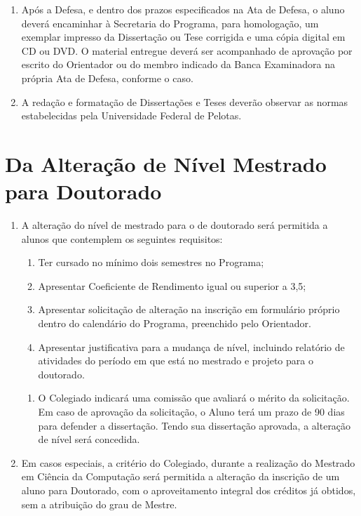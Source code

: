 \documentclass{article}
\newcommand{\singleitem}{\item[Parágrafo Único.]}
\newcommand{\grupoMenor}{Colegiado\xspace}
\begin{document}
\begin{enumerate}
	\item Após a Defesa, e dentro dos prazos especificados na Ata de Defesa, o aluno deverá encaminhar à Secretaria do Programa, para homologação, um exemplar impresso da Dissertação ou Tese corrigida e uma cópia digital em CD ou DVD. O material entregue deverá ser acompanhado de aprovação por escrito do Orientador ou do membro indicado da Banca Examinadora na própria Ata de Defesa, conforme o caso.

	\item A redação e formatação de Dissertações e Teses deverão observar as normas estabelecidas pela Universidade Federal de Pelotas.

\end{enumerate}



\section{Da Alteração de Nível Mestrado para Doutorado}
\begin{enumerate}
	\item  A alteração do nível de mestrado para o de doutorado será permitida a alunos que contemplem os seguintes requisitos:
	\begin{enumerate}[label=\Roman*]
		\item Ter cursado no mínimo dois semestres no Programa;

		\item Apresentar Coeficiente de Rendimento igual ou superior a 3,5;

		\item Apresentar solicitação de alteração na inscrição em formulário próprio dentro do calendário do Programa, preenchido pelo Orientador.

		\item Apresentar justificativa para a mudança de nível, incluindo relatório de atividades do período em que está no mestrado e projeto para o doutorado.
	\end{enumerate}

	\begin{enumerate}
		\singleitem O \grupoMenor indicará uma comissão que avaliará o mérito da solicitação. Em caso de aprovação da solicitação, o Aluno terá um prazo de 90 dias para defender a dissertação. Tendo sua dissertação aprovada, a alteração de nível será concedida.
	\end{enumerate}

	\item Em casos especiais, a critério do \grupoMenor, durante a realização do Mestrado em Ciência da Computação será permitida a alteração da inscrição de um aluno para Doutorado, com o aproveitamento integral dos créditos já obtidos, sem a atribuição do grau de Mestre.
\end{enumerate}
\end{document}
